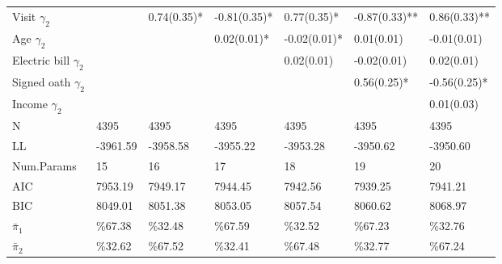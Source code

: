 \begin{tabular}{lllllll}
  Visit $\gamma_{2}$ &  &  0.74(0.35)*   & -0.81(0.35)*   &  0.77(0.35)*   & -0.87(0.33)**  &  0.86(0.33)**  \\ 
  Age $\gamma_{2}$ &  &  &  0.02(0.01)*   & -0.02(0.01)*   &  0.01(0.01)    & -0.01(0.01)    \\ 
  Electric bill $\gamma_{2}$ &  &  &  &  0.02(0.01)    & -0.02(0.01)    &  0.02(0.01)    \\ 
  Signed oath $\gamma_{2}$ &  &  &  &  &  0.56(0.25)*   & -0.56(0.25)*   \\ 
  Income $\gamma_{2}$ &  &  &  &  &  &  0.01(0.03)    \\ 
  N & 4395 & 4395 & 4395 & 4395 & 4395 & 4395 \\ 
  LL & -3961.59 & -3958.58 & -3955.22 & -3953.28 & -3950.62 & -3950.60 \\ 
  Num.Params & 15 & 16 & 17 & 18 & 19 & 20 \\ 
  AIC & 7953.19 & 7949.17 & 7944.45 & 7942.56 & 7939.25 & 7941.21 \\ 
  BIC & 8049.01 & 8051.38 & 8053.05 & 8057.54 & 8060.62 & 8068.97 \\ 
  $\bar{\pi}_{1}$ & \%67.38 & \%32.48 & \%67.59 & \%32.52 & \%67.23 & \%32.76 \\ 
  $\bar{\pi}_{2}$ & \%32.62 & \%67.52 & \%32.41 & \%67.48 & \%32.77 & \%67.24 \\ 
   \hline
\end{tabular}

